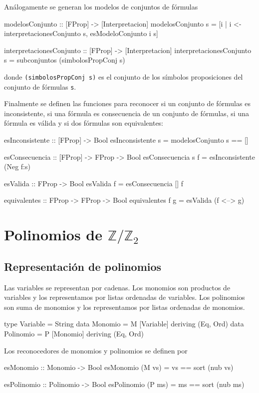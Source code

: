 \documentclass{llncs}
\newcommand{\Z}{\mathbb Z}
\begin{document}
Análogamente se generan los modelos de conjuntos de fórmulas
\begin{code}
modelosConjunto :: [FProp] -> [Interpretacion]
modelosConjunto s =
    [i | i <- interpretacionesConjunto s, esModeloConjunto i s]

interpretacionesConjunto :: [FProp] -> [Interpretacion]
interpretacionesConjunto s = subconjuntos (simbolosPropConj s)
\end{code}
donde \verb|(simbolosPropConj s)| es el conjunto de los símbolos proposiciones
del conjunto de fórmulas \verb|s|. 

Finalmente se definen las funciones para reconocer si un conjunto de fórmulas
es inconsistente, si una fórmula es consecuencia de un conjunto de fórmulas,
si una fórmula es válida y si dos fórmulas son equivalentes:
\begin{code}
esInconsistente :: [FProp] -> Bool
esInconsistente s =
    modelosConjunto s == []

esConsecuencia :: [FProp] -> FProp -> Bool
esConsecuencia s f = esInconsistente (Neg f:s)

esValida :: FProp -> Bool
esValida f = esConsecuencia [] f

equivalentes :: FProp -> FProp -> Bool
equivalentes f g = esValida (f <--> g)
\end{code}

\section{Polinomios de $\Z/\Z_2$}

\subsection{Representación de polinomios}

Las variables se representan por cadenas. Los monomios son productos de
variables y los representamos por listas ordenadas de variables. Los
polinomios son suma de monomios y los representamos por listas ordenadas de
monomios.
\begin{code}
type Variable = String
data Monomio = M [Variable] deriving (Eq, Ord)
data Polinomio = P [Monomio] deriving (Eq, Ord)  
\end{code}
Los reconocedores de monomios y polinomios se definen por
\begin{code}
esMonomio :: Monomio -> Bool
esMonomio (M vs) = vs == sort (nub vs)

esPolinomio :: Polinomio -> Bool
esPolinomio (P ms) = ms == sort (nub ms)  
\end{code}
\end{document}
